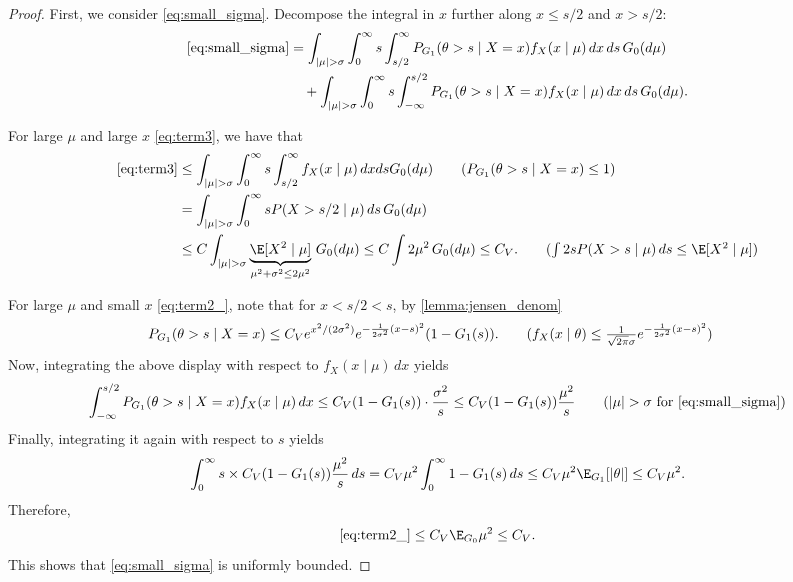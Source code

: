 \documentclass[12pt, reqno]{amsart}
\numberwithin{equation}{section}
\begin{document}
\begin{refsection}
\begin{appendices}
\begin{proof}
First, we consider \eqref{eq:small_sigma}. Decompose the integral in $x$ further along $x
\le s/2$ and $x > s/2$: 
\begin{align}
\eqref{eq:small_sigma} &= \int_{|\mu| > \sigma} \int_0^\infty s \int_{s/2}^{\infty}P_{G_1}
(\theta > s
\mid X=x) f_X(x\mid \mu) \,dx \,ds \,G_0(d\mu)\label{eq:term3}
\\&\quad + \int_{|\mu| > \sigma} \int_0^\infty s \int_{-\infty}^{s/2} P_{G_1}
(\theta > s
\mid X=x) f_X(x\mid \mu) \,dx \,ds\,G_0(d\mu) \label{eq:term2_}.
\end{align}

For large $\mu$ and large $x$ \eqref{eq:term3}, we have that
\begin{align*}
\eqref{eq:term3} &\le \int_{|\mu| > \sigma} \int_0^\infty s \int_{s/2}^{\infty} f_X(x\mid
\mu) \,dx ds G_0(d\mu) \tag{$P_{G_1}
(\theta > s
\mid X=x) \le 1$}\\
&= \int_{|\mu| > \sigma} \int_0^\infty s P(X > s/2 \mid \mu)\,ds \,G_0(d\mu) \\ 
&\le C\int_{|\mu| > \sigma} \underbrace{\E[X^2 \mid \mu]}_{\mu^2 + \sigma^2 \le
2\mu^2}\, G_0(d\mu)  \le C \int
2\mu^2
\,G_0(d\mu) \le C_{V}.\tag{$\int 2sP(X > s \mid \mu)\,ds \le \E[X^2 \mid \mu]$}
\end{align*}

For large $\mu$ and small $x$ \eqref{eq:term2_}, note that for $x < s/2< s$, by 
\cref{lemma:jensen_denom}
\begin{align*}
P_{G_1}(\theta > s \mid X=x) &\le C_{V} e^{x^2/(2\sigma^2)} e^{-\frac{1}{2\sigma^2}(x-s)^2}
(1-G_1(s)). \tag{$f_X(x\mid \theta) \le \frac{1}{\sqrt{2\pi} \sigma} e^{-\frac{1}
{2\sigma^2} (x-s)^2}$}
\end{align*}
Now, integrating the above display with respect to $f_X(x\mid \mu)\,dx$ yields \[
 \int_{-\infty}^{s/2}P_{G_1}
(\theta > s
\mid X=x) f_X(x\mid \mu) \,dx \le C_{V}(1-G_1(s)) \cdot \frac{\sigma^2}{s} \le 
C_{V}(1-G_1(s)) \frac{\mu^2} {s} \tag{$|\mu| > \sigma$ for \eqref{eq:small_sigma}}
\]
Finally, integrating it again with respect to $s$ yields \[
\int_0^\infty s \times C_{V}(1-G_1(s)) \frac{\mu^2} {s} \,ds = C_V \mu^2 \int_{0}^\infty
1-G_1(s)\,ds \le C_V \mu^2 \E_{G_1}[|\theta|] \le C_V \mu^2.
\]
Therefore, \[
\eqref{eq:term2_} \le  C_V \E_{G_0}\mu^2 \le C_V.
\]
This shows that \eqref{eq:small_sigma} is uniformly bounded. 



\end{proof}
\end{appendices}
\end{refsection}
\end{document}
